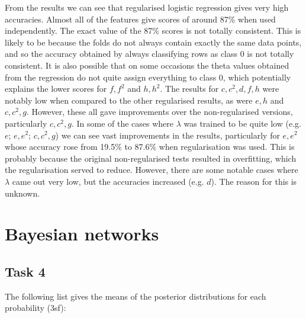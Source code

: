 \documentclass[a4paper,11pt]{article}
\begin{document}
From the results we can see that regularised logistic regression gives very high accuracies.  Almost all of the features give scores of around 87\% when used independently.  The exact value of the 87\%{} scores is not totally consistent.  This is likely to be because the folds do not always contain exactly the same data points, and so the accuracy obtained by always classifying rows as class 0 is not totally consistent.  It is also possible that on some occasions the theta values obtained from the regression do not quite assign everything to class 0, which potentially explains the lower scores for $f,f^2$ and $h,h^2$.  The results for $c,c^2,d,f,h$ were notably low when compared to the other regularised results, as were $e,h$ and $c,c^2,g$.  However, these all gave improvements over the non-regularised versions, particularly $c,c^2,g$.  In some of the cases where $\lambda$ was trained to be quite low (e.g. $e$; $e,e^2$; $c,c^2,g$) we can see vast improvements in the results, particularly for $e,e^2$ whose accuracy rose from 19.5\%{} to 87.6\%{} when regularisation was used.  This is probably because the original non-regularised tests resulted in overfitting, which the regularisation served to reduce.  However, there are some notable cases where $\lambda$ came out very low, but the accuracies increased (e.g. $d$).  The reason for this is unknown.

\section{Bayesian networks}

\subsection{Task 4}

The following list gives the means of the posterior distributions for each probability (3sf):
\end{document}
